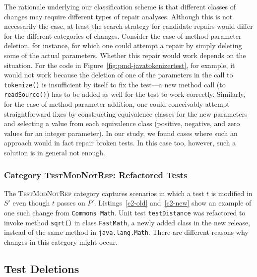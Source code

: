 \documentclass[conference]{IEEEtran}
\newcommand{\lang}[1]{\texttt{\small #1}}
\newcommand{\subject}[1]{\texttt{\small #1}}
\newcommand{\catref}{\textsc{TestModNotRep}}
\begin{document}
The rationale underlying our classification scheme is that different
classes of changes may require different types of repair analyses.
Although this is not necessarily the case, at least the search
strategy for candidate repairs would differ for the different
categories of changes. Consider the case of method-parameter deletion,
for instance, for which one could attempt a repair by simply deleting
some of the actual parameters. Whether this repair would work depends
on the situation. For the code in
Figure~\ref{fig:pmd-javatokenizertest}, for example, it would not work
because the deletion of one of the parameters in the call to
\lang{tokenize()} is insufficient by itself to fix the test---a new
method call (to \lang{readSource()}) has to be added as well for the
test to work correctly.  Similarly, for the case of method-parameter
addition, one could conceivably attempt straightforward fixes by
constructing equivalence classes for the new parameters and selecting
a value from each equivalence class (\eg positive, negative, and zero
values for an integer parameter). In our study, we found cases where
such an approach would in fact repair broken tests. In this case too,
however, such a solution is in general not enough.

\subsubsection{Category \catref{}: Refactored Tests}
\label{sec:category-c2}

The \catref{} category captures scenarios in which a test $t$ is
modified in $S'$ even though $t$ passes on $P'$.
Listings~\ref{c2-old} and~\ref{c2-new} show an example of one such
change from \subject{Commons Math}. Unit test \lang{testDistance} was
refactored to invoke method \lang{sqrt()} in class \lang{FastMath}, a
newly added class in the new release, instead of the same method in
\lang{java.lang.Math}.  There are different reasons why changes in
this category might occur.

\vspace{-8pt}


\vspace{-8pt}


\subsection{Test Deletions}
\label{sec:test-ref}
\end{document}
